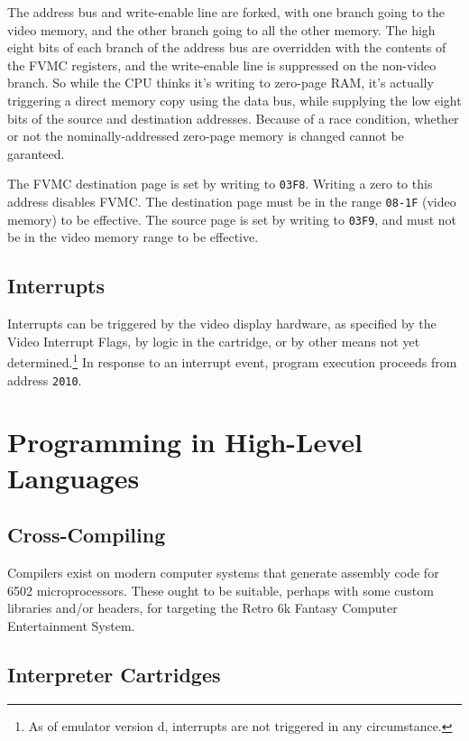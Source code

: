 \documentclass[12pt]{{memoir}}
\begin{document}
The address bus and write-enable line are forked, with one branch going to the video memory, and the other branch going to all the other memory. The high eight bits of each branch of the address bus are overridden with the contents of the FVMC registers, and the write-enable line is suppressed on the non-video branch. So while the CPU thinks it's writing to zero-page RAM, it's actually triggering a direct memory copy using the data bus, while supplying the low eight bits of the source and destination addresses. Because of a race condition, whether or not the nominally-addressed zero-page memory is changed cannot be garanteed.

The FVMC destination page is set by writing to \texttt{03F8}. Writing a zero to this address disables FVMC. The destination page must be in the range \texttt{08-1F} (video memory) to be effective. The source page is set by writing to \texttt{03F9}, and must not be in the video memory range to be effective.

\section{Interrupts}

Interrupts can be triggered by the video display hardware, as specified by the Video Interrupt Flags, by logic in the cartridge, or by other means not yet determined.\footnote{As of emulator version d, interrupts are not triggered in any circumstance.} In response to an interrupt event, program execution proceeds from address \texttt{2010}.

\chapter{Programming in High-Level Languages}
\section{Cross-Compiling}

Compilers exist on modern computer systems that generate assembly code for 6502 microprocessors. These ought to be suitable, perhaps with some custom libraries and/or headers, for targeting the Retro 6k Fantasy Computer Entertainment System.

\section{Interpreter Cartridges}
\end{document}
